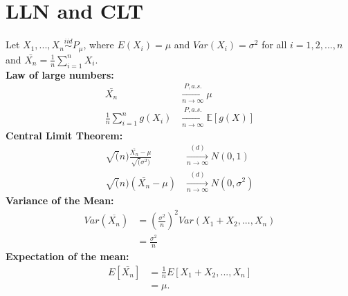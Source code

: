 \section{LLN and CLT}
Let $X_1, ..., X_n \stackrel{iid}{\sim} P_{\mu}$, where $E(X_i)=\mu$ and $Var(X_i)=\sigma^2$ for all $i=1,2,...,n$ and $\bar{X_n}= \frac{1}{n} \sum_{i=1}^{n} X_i$.\\
\textbf{Law of large numbers:}
\begin{align*}
\bar{X_n}& \xrightarrow[n \rightarrow \infty]{P, a.s.} \mu\\
\frac{1}{n} \sum_{i=1}^{n} g(X_i)& \xrightarrow[n \rightarrow \infty]{P, a.s.} \mathbb{E}[g(X)]
\end{align*}
\textbf{Central Limit Theorem:}
\begin{align*}
\sqrt(n)\frac{\bar{X_n}-\mu}{\sqrt(\sigma^2)}& \xrightarrow[n \rightarrow \infty]{(d)} N(0,1)\\
\sqrt(n)(\bar{X_n}-\mu)& \xrightarrow[n \rightarrow \infty]{(d)} N(0,\sigma^2)
\end{align*}
\textbf{Variance of the Mean:}
\begin{align*}
Var(\overline{X_n})&=(\frac{\sigma^2}{n})^2 Var(X_1 + X_2,...,X_n)\\
& =\frac{\sigma^2}{n}
\end{align*}
\textbf{Expectation of the mean:}
\begin{align*}
E[\bar{X_n}] & =\frac{1}{n}E[X_1 + X_2,...,X_n]\\
&=\mu.
\end{align*}